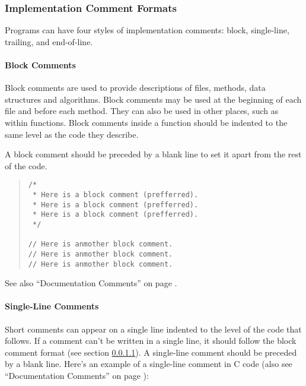 \documentclass{article}
\begin{document}
\subsubsection{Implementation Comment Formats}

Programs can have four styles of implementation comments: block,
single-line, trailing, and end-of-line. 

\paragraph{Block Comments}
\label{sec:cguide:block_comments}

Block comments are used to provide descriptions of files, methods,
data structures and algorithms. Block comments may be used at the
beginning of each file and before each method. They can also be used
in other places, such as within functions. Block comments inside a
function should be indented to the same level as the code
they describe.

A block comment should be preceded by a blank line to set it apart
from the rest of the code.

\begin{quote}
\begin{verbatim}
/*
 * Here is a block comment (prefferred).
 * Here is a block comment (prefferred).
 * Here is a block comment (prefferred).
 */

// Here is anmother block comment.
// Here is anmother block comment.
// Here is anmother block comment.

\end{verbatim}
\end{quote}

See also ``Documentation Comments'' on page \pageref{sec:cguide:doc_comments}. 

\paragraph{Single-Line Comments}
\label{sec:cguide:sline_comments}

Short comments can appear on a single line indented to the level of
the code that follows. If a comment can't be written in a single line,
it should follow the block comment format (see section
\ref{sec:cguide:block_comments}). A single-line comment should be preceded by
a blank line. Here's an example of a single-line comment in C code
(also see ``Documentation Comments'' on page
\pageref{sec:cguide:doc_comments}):
\end{document}
